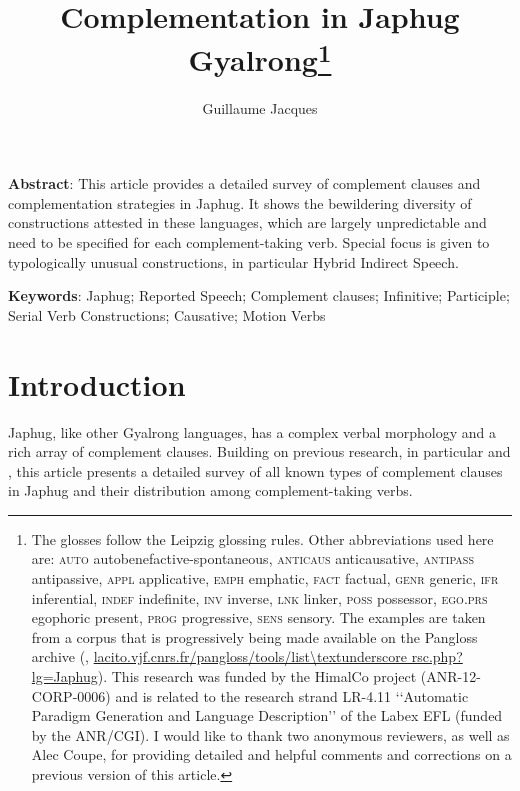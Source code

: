 \documentclass[oneside,a4paper,11pt]{article}
\begin{document}
 

\title{Complementation in Japhug Gyalrong\footnote{The glosses follow the Leipzig glossing rules. Other abbreviations used here are: \textsc{auto}  autobenefactive-spontaneous, \textsc{anticaus} anticausative, \textsc{antipass} antipassive, \textsc{appl} applicative, \textsc{emph} emphatic, \textsc{fact} factual, \textsc{genr} generic, \textsc{ifr} inferential, \textsc{indef} indefinite, \textsc{inv} inverse,  \textsc{lnk} linker, \textsc{poss} possessor, \textsc{ego.prs} egophoric present, \textsc{prog} progressive, \textsc{sens} sensory. The examples are taken from a corpus that is progressively being made available on the Pangloss archive (\citealt{michailovsky14pangloss},  \url{lacito.vjf.cnrs.fr/pangloss/tools/list\textunderscore rsc.php?lg=Japhug}).  
This research was funded by the HimalCo project (ANR-12-CORP-0006) and is related to the research strand LR-4.11 ‘‘Automatic Paradigm Generation and Language Description’’ of the Labex EFL (funded by the ANR/CGI). I would like to thank two anonymous reviewers, as well as Alec Coupe, for providing detailed and helpful comments and corrections on a previous version of this article.
}}
\author{Guillaume Jacques}
\maketitle
\textbf{Abstract}: This article provides a detailed survey of complement clauses and complementation strategies in Japhug. It shows the bewildering diversity of constructions attested in these languages, which are largely unpredictable and need to be specified for each complement-taking verb. Special focus is given to typologically unusual constructions, in particular Hybrid Indirect Speech.

\textbf{Keywords}: Japhug; Reported Speech; Complement clauses; Infinitive; Participle; Serial Verb Constructions; Causative; Motion Verbs

\section*{Introduction}
Japhug, like other Gyalrong languages, has a complex verbal morphology and a rich array of complement clauses. Building on previous research, in particular  \citet[337-356]{jacques08} and \citet{sun12complementation}, this article presents a detailed survey of all known types of complement clauses in Japhug and their distribution among complement-taking verbs. 
\end{document}
